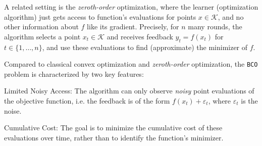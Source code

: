 \documentclass[letter, 12pt]{report}
\newcommand{\cK}{\mathcal K}
\newcommand{\1}{\mathbf{1}}
\newcommand{\bco}{\texttt{BCO}\xspace}
\renewcommand{\epsilon}{\varepsilon}
\theoremstyle{plain}
\theoremstyle{definition}
\theoremstyle{remark}
\begin{document}
A related setting is the \emph{zeroth-order} optimization, where the learner (optimization algorithm) just gets access to function's evaluations for points $x\in\cK$, and no other information about $f$ like its gradient.
Precisely, for $n$ many rounds, the algorithm selects a point \( x_t \in \cK \) and receives feedback \( y_t = f(x_t)\) for $t \in \{1, \ldots, n\}$, and use these evaluations to find (approximate) the minimizer of $f$.

Compared to classical convex optimization and \emph{zeroth-order} optimization, the \bco problem is characterized by two key features:
\begin{enumroman}
    \item \textcolor{dkblue}{Limited Noisy Access:} The algorithm can only observe \textit{noisy} point evaluations of the objective function, i.e. the feedback is of the form \( f(x_t) + \epsilon_t \), where \( \epsilon_t \) is the noise.
    \item \textcolor{dkblue}{Cumulative Cost:} The goal is to minimize the cumulative cost of these evaluations over time, rather than to identify the function’s minimizer.
\end{enumroman}
\end{document}
